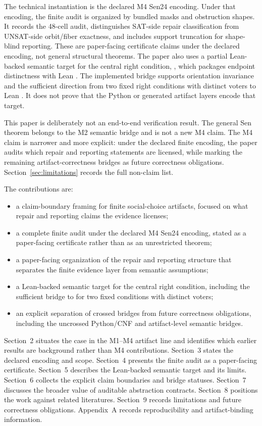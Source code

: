 The technical instantiation is the declared M4 Sen24 encoding. Under that
encoding, the finite audit is organized by bundled masks and obstruction
shapes. It records the 48-cell audit, distinguishes SAT-side repair
classification from UNSAT-side orbit/fiber exactness, and includes support
truncation for shape-blind reporting. These are paper-facing certificate
claims under the declared encoding, not general structural theorems. The paper
also uses a partial Lean-backed semantic target for the central right
condition, , which packages endpoint distinctness
with Lean . The implemented bridge supports orientation
invariance and the sufficient direction from two fixed right conditions with
distinct voters to Lean . It does not prove that the Python or
generated artifact layers encode that target.

This paper is deliberately not an end-to-end verification result. The general
Sen theorem belongs to the M2 semantic bridge and is not a new M4 claim. The
M4 claim is narrower and more explicit: under the declared finite encoding,
the paper audits which repair and reporting statements are licensed, while
marking the remaining artifact-correctness bridges as future correctness
obligations. Section~\ref{sec:limitations} records the full non-claim list.

The contributions are:

\begin{itemize}[leftmargin=*]
\item a claim-boundary framing for finite social-choice artifacts, focused on
  what repair and reporting claims the evidence licenses;
\item a complete finite audit under the declared M4 Sen24 encoding, stated as
  a paper-facing certificate rather than as an unrestricted theorem;
\item a paper-facing organization of the repair and reporting structure that
  separates the finite evidence layer from semantic assumptions;
\item a Lean-backed semantic target for the central right condition, including
  the sufficient bridge to  for two fixed conditions with distinct
  voters;
\item an explicit separation of crossed bridges from future correctness
  obligations, including the uncrossed Python/CNF and artifact-level semantic
  bridges.
\end{itemize}

Section~2 situates the case in the M1--M4 artifact line and identifies which
earlier results are background rather than M4 contributions. Section~3 states
the declared encoding and scope. Section~4 presents the finite audit as a
paper-facing certificate. Section~5 describes the Lean-backed semantic target
and its limits. Section~6 collects the explicit claim boundaries and bridge
statuses. Section~7 discusses the broader value of auditable abstraction
contracts. Section~8 positions the work against related literatures.
Section~9 records limitations and future correctness obligations. Appendix~A
records reproducibility and artifact-binding information.
